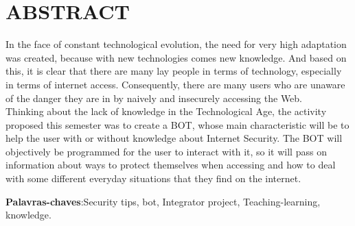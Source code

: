 \noindent\chapter*{\uppercase{Abstract}}

In the face of constant technological evolution, the need for very high adaptation was created, because with new technologies comes new knowledge. And based on this, it is clear that there are many lay people in terms of technology, especially in terms of internet access. Consequently, there are many users who are unaware of the danger they are in by naively and insecurely accessing the Web.\\

Thinking about the lack of knowledge in the Technological Age, the activity proposed this semester was to create a BOT, whose main characteristic will be to help the user with or without knowledge about Internet Security. The BOT will objectively be programmed for the user to interact with it, so it will pass on information about ways to protect themselves when accessing and how to deal with some different everyday situations that they find on the internet.

\vspace{1cm}

\noindent \textbf{Palavras-chaves}:Security tips, bot, Integrator project, Teaching-learning, knowledge.